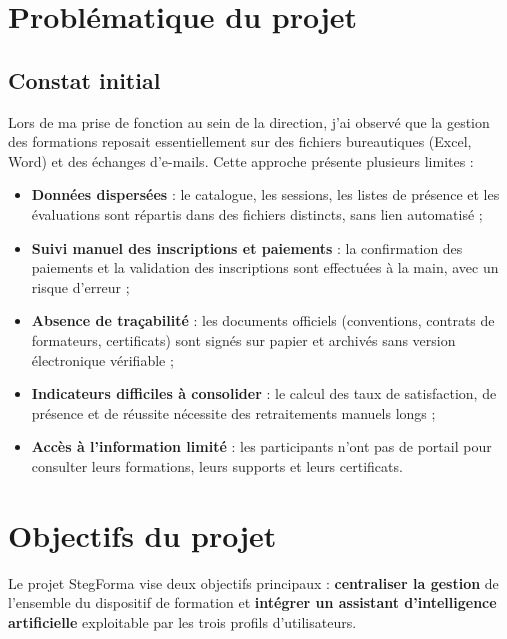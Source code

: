 \documentclass[12pt,a4paper]{report}
\begin{document}
\section{Problématique du projet}

\subsection{Constat initial}

Lors de ma prise de fonction au sein de la direction, j'ai observé que la gestion des formations reposait essentiellement sur des fichiers bureautiques (Excel, Word) et des échanges d'e-mails. Cette approche présente plusieurs limites :
\begin{itemize}
    \item \textbf{Données dispersées} : le catalogue, les sessions, les listes de présence et les évaluations sont répartis dans des fichiers distincts, sans lien automatisé ;
    \item \textbf{Suivi manuel des inscriptions et paiements} : la confirmation des paiements et la validation des inscriptions sont effectuées à la main, avec un risque d'erreur ;
    \item \textbf{Absence de traçabilité} : les documents officiels (conventions, contrats de formateurs, certificats) sont signés sur papier et archivés sans version électronique vérifiable ;
    \item \textbf{Indicateurs difficiles à consolider} : le calcul des taux de satisfaction, de présence et de réussite nécessite des retraitements manuels longs ;
    \item \textbf{Accès à l'information limité} : les participants n'ont pas de portail pour consulter leurs formations, leurs supports et leurs certificats.
\end{itemize}

\section{Objectifs du projet}

Le projet StegForma vise deux objectifs principaux : \textbf{centraliser la gestion} de l'ensemble du dispositif de formation et \textbf{intégrer un assistant d'intelligence artificielle} exploitable par les trois profils d'utilisateurs.
\end{document}
